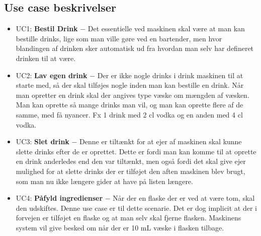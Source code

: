 \subsection{Use case beskrivelser}
\begin{itemize}
    \item UC1: \textbf{Bestil Drink} $-$ Det essentielle ved maskinen skal være at man kan bestille drinks, lige som man ville gøre ved en bartender, men hvor blandingen af drinken sker automatisk ud fra hvordan man selv har defineret drinken til at være.
    
    \item UC2: \textbf{Lav egen drink} $-$ Der er ikke nogle drinks i drink maskinen til at starte med, så der skal tilføjes nogle inden man kan bestille en drink. Når man opretter en drink skal der angives type væske om mængden af væsken. Man kan oprette så mange drinks man vil, og man kan oprette flere af de samme, med få nyancer. Fx 1 drink med 2 cl vodka og en anden med 4 cl vodka.
    
    
    \item UC3: \textbf{Slet drink} $-$ Denne er tiltænkt for at ejer af maskinen skal kunne slette drinks efter de er oprettet. Dette er fordi man kan komme til at oprette en drink anderledes end den var tiltænkt, men også fordi det skal give ejer mulighed for at slette drinks der er tilføjet den aften maskinen blev brugt, som man nu ikke længere gider at have på listen længere. 
    
    \item UC4: \textbf{Påfyld ingredienser} $-$ Når der en flaske der er ved at være tom, skal den udskiftes. Denne use case er til dette scenarie. Det er dog implicit at der i forvejen er tilføjet en flaske og at man selv skal fjerne flasken. Maskinens system vil give besked om når der er 10 mL væske i flasken tilbage.
    
    

\end{itemize}
